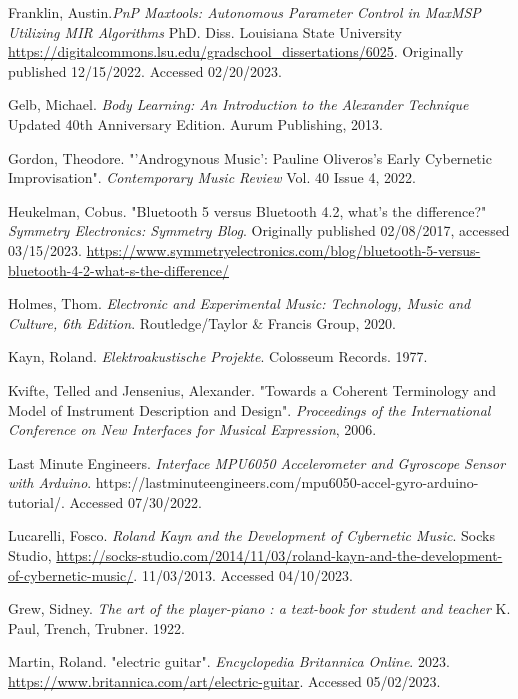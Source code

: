 \begin{thebibliography}{99}
 Franklin, Austin.\emph{PnP Maxtools: Autonomous Parameter Control in MaxMSP Utilizing MIR Algorithms} PhD. Diss. Louisiana State University
\url{https://digitalcommons.lsu.edu/gradschool_dissertations/6025}. Originally published 12/15/2022. Accessed 02/20/2023.

 Gelb, Michael. \emph{Body Learning: An Introduction to the Alexander Technique} Updated 40th Anniversary Edition. Aurum Publishing, 2013.

 Gordon, Theodore. "'Androgynous Music': Pauline Oliveros's Early Cybernetic Improvisation". \textit{Contemporary Music Review} Vol. 40 Issue 4, 2022.

 Heukelman, Cobus. "Bluetooth 5 versus Bluetooth 4.2, what’s the difference?" \textit{Symmetry Electronics: Symmetry Blog}. Originally published 02/08/2017, accessed 03/15/2023. \url{https://www.symmetryelectronics.com/blog/bluetooth-5-versus-bluetooth-4-2-what-s-the-difference/}

 Holmes, Thom. \emph{Electronic and Experimental Music: Technology, Music and Culture, 6th Edition}. Routledge/Taylor \& Francis Group, 2020.

 Kayn, Roland. \emph{Elektroakustische Projekte}. Colosseum Records. 1977.

 Kvifte, Telled and Jensenius, Alexander. "Towards a Coherent Terminology and Model of Instrument Description and Design". \textit{Proceedings of the International Conference on New Interfaces for Musical Expression}, 2006.

 Last Minute Engineers. \emph{Interface MPU6050 Accelerometer and Gyroscope Sensor with Arduino}. https://lastminuteengineers.com/mpu6050-accel-gyro-arduino-tutorial/. Accessed 07/30/2022.

 Lucarelli, Fosco. \emph{Roland Kayn and the Development of Cybernetic Music}. Socks Studio, \url{https://socks-studio.com/2014/11/03/roland-kayn-and-the-development-of-cybernetic-music/}. 11/03/2013. Accessed 04/10/2023.

 Grew, Sidney. \emph{The art of the player-piano : a text-book for student and teacher} K. Paul, Trench, Trubner. 1922.

 Martin, Roland. "electric guitar". \textit{Encyclopedia Britannica Online}. 2023. \url{https://www.britannica.com/art/electric-guitar}. Accessed 05/02/2023.


\end{thebibliography}
